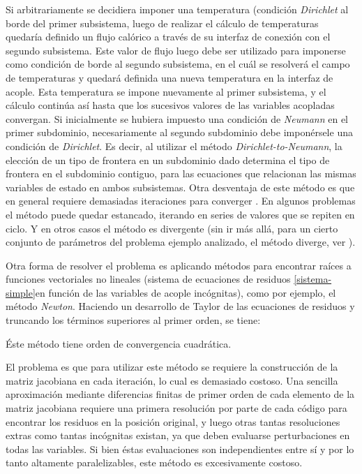 Si arbitrariamente se decidiera imponer una temperatura (condición \textit{Dirichlet} al borde del primer subsistema,
luego de realizar el cálculo de temperaturas quedaría definido un flujo calórico a través de su interfaz de conexión con el segundo subsistema.
Este valor de flujo luego debe ser utilizado para imponerse como condición de borde al segundo subsistema,
en el cuál se resolverá el campo de temperaturas y quedará definida una nueva temperatura en la interfaz de acople.
Esta temperatura se impone nuevamente al primer subsistema, y el cálculo continúa así hasta que los sucesivos valores de las variables acopladas convergan.
Si inicialmente se hubiera impuesto una condición de \textit{Neumann} en el primer subdominio, necesariamente al segundo subdominio debe imponérsele una condición de \textit{Dirichlet}. Es decir, al utilizar el método \textit{Dirichlet-to-Neumann}, la elección de un tipo de frontera en un subdominio dado determina el tipo de frontera en el subdominio contiguo,
para las ecuaciones que relacionan las mismas variables de estado en ambos subsistemas.
Otra desventaja de este método es que en general requiere demasiadas iteraciones para converger \cite{XXX}. En algunos problemas el método puede quedar estancado, iterando en series de valores que se repiten en ciclo. Y en otros casos el método es divergente (sin ir más allá, para un cierto conjunto de parámetros del problema ejemplo analizado, el método diverge, ver \cite{XXX}).

Otra forma de resolver el problema es aplicando métodos para encontrar raíces a funciones vectoriales no lineales (sistema de ecuaciones de residuos \ref{sistema-simple}en función de las variables de acople incógnitas),
como por ejemplo, el método \textit{Newton}.
Haciendo un desarrollo de Taylor de las ecuaciones de residuos y truncando los términos superiores al primer orden, se tiene:

\begin{equation}

\end{equation}
Éste método tiene orden de convergencia cuadrática.

El problema es que para utilizar este método se requiere la construcción de la matriz jacobiana en cada iteración, lo cual es demasiado costoso.
Una sencilla aproximación mediante diferencias finitas de primer orden de cada elemento de la matriz jacobiana 
requiere una primera resolución por parte de cada código para encontrar los residuos en la posición original, y luego otras tantas resoluciones extras
como tantas incógnitas existan, ya que deben evaluarse perturbaciones en todas las variables.
Si bien éstas evaluaciones son independientes entre sí y por lo tanto altamente paralelizables, este método es excesivamente costoso.


